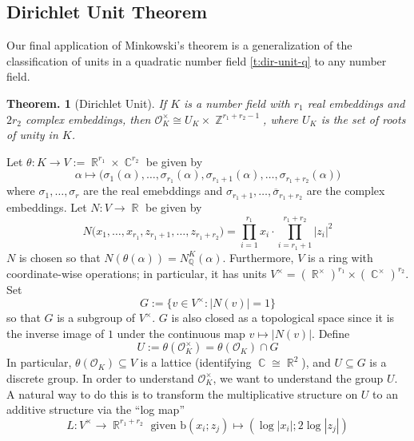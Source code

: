 \documentclass[11pt, a4paper]{memoir}
\DeclareMathOperator{\Q}{{\mathbb{Q}}}
\DeclareMathOperator{\Z}{{\mathbb{Z}}}
\DeclareMathOperator{\R}{{\mathbb{R}}}
\DeclareMathOperator{\C}{{\mathbb{C}}}
\newcommand{\ol}[1]{\ensuremath{\overline{#1}}}
\theoremstyle{change}
\newtheorem{theorem}{Theorem.}[section]
\theoremstyle{plain}
\theoremstyle{nonumberplain}
\numberwithin{equation}{section}
\begin{document}
\subsection{Dirichlet Unit Theorem}
Our final application of Minkowski's theorem is a generalization of the classification of units in a quadratic number field \cref{t:dir-unit-q} to any number field.
\begin{theorem}[Dirichlet Unit]\label{t:dir-unit}
    If $K$ is a number field with $r_1$ real embeddings and $2r_2$ complex embeddings, then $\mathcal{O}_K^\times\cong U_K\times\Z^{r_1+r_2-1}$, where $U_K$ is the set of roots of unity in $K$.
\end{theorem}
Let $\theta:K\to V:=\R^{r_1}\times\C^{r_2}$ be given by
\begin{equation*}
    \alpha\mapsto\bigl(\sigma_1(\alpha),\ldots,\sigma_{r_1}(\alpha),\sigma_{r_1+1}(\alpha),\ldots,\sigma_{r_1+r_2}(\alpha)\bigr)
\end{equation*}
where $\sigma_1,\ldots,\sigma_r$ are the real emebddings and $\sigma_{r_1+1},\ldots,\ol{\sigma}_{r_1+r_2}$ are the complex embeddings.
Let $N:V\to\R$ be given by
\begin{equation*}
    N\bigl(x_1,\ldots,x_{r_1},z_{r_1+1},\ldots,z_{r_1+r_2}\bigr)=\prod_{i=1}^{r_1}x_i\cdot\prod_{i=r_1+1}^{r_1+r_2}|z_i|^2
\end{equation*}
$N$ is chosen so that $N(\theta(\alpha))=N^K_{\Q}(\alpha)$.
Furthermore, $V$ is a ring with coordinate-wise operations; in particular, it has units $V^\times=(\R^\times)^{r_1}\times(\C^\times)^{r_2}$.
Set
\begin{equation*}
    G:=\{v\in V^\times:|N(v)|=1\}
\end{equation*}
so that $G$ is a subgroup of $V^\times$.
$G$ is also closed as a topological space since it is the inverse image of $1$ under the continuous map $v\mapsto|N(v)|$.
Define
\begin{equation*}
    U:=\theta(\mathcal{O}_K^\times)=\theta(\mathcal{O}_K)\cap G
\end{equation*}
In particular, $\theta(\mathcal{O}_K)\subseteq V$ is a lattice (identifying $\C\cong\R^2$), and $U\subseteq G$ is a discrete group.
In order to understand $\mathcal{O}_K^\times$, we want to understand the group $U$.
A natural way to do this is to transform the multiplicative structure on $U$ to an additive structure via the ``log map''
\begin{equation*}
    L:V^\times\to\R^{r_1+r_2}\text{ given b}(x_i;z_j)\mapsto(\log|x_i|;2\log|z_j|)
\end{equation*}
\end{document}
